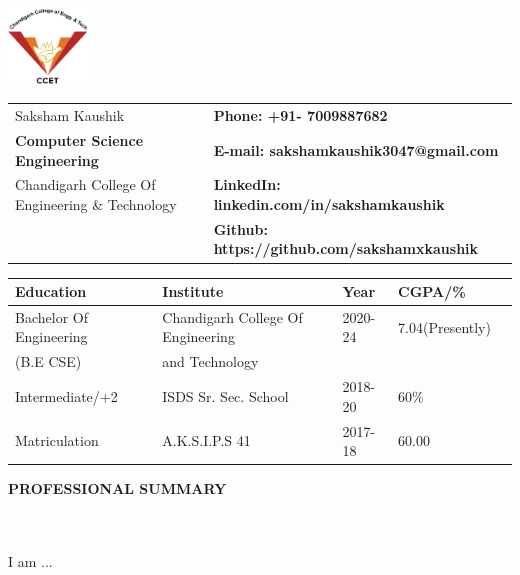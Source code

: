 \documentclass[a4paper,10pt]{article}
\newcommand{\resheading}[1]{{\small \colorbox{mygrey}{\begin{minipage}{0.99\textwidth}{\textbf{#1 \vphantom{p\^{E}}}}\end{minipage}}}}
\begin{document}

\begin{table}
    \begin{minipage}{0.15\linewidth}
        \centering
        \includegraphics[height =0.8in]{ccetLogoBlack (2).png}
    \end{minipage}
    \begin{minipage}{0.45\linewidth}
        \setlength{\tabcolsep}{15pt}
        \def\arraystretch{1.15}
        \begin{tabular}{ll}
            \usepackage{hyperref}{\Large{Saksham Kaushik}}  & \textbf{Phone: +91-  7009887682} \\
            \textbf{Computer Science Engineering} & \textbf{E-mail: sakshamkaushik3047@gmail.com} \\
        Chandigarh College Of Engineering \& Technology  &  \textbf{LinkedIn: linkedin.com/in/sakshamkaushik}  \\
        \textbf{} & \textbf{Github: https://github.com/sakshamxkaushik}
        \end{tabular}
    \end{minipage}
\end{table}    

\setlength{\tabcolsep}{18pt}
\begin{table}
\centering
\begin{tabular}{lllll}
\toprule
\textbf{Education}   & \textbf{Institute}    & \textbf{Year}     & \textbf{CGPA/\%} \\ 
\toprule
Bachelor Of Engineering      & Chandigarh College Of Engineering & 2020-24   & 7.04(Presently)\\ 
(B.E CSE) & and Technology\\
Intermediate/+2     & ISDS Sr. Sec. School & 2018-20& 60\%    \\ 
Matriculation   & A.K.S.I.P.S 41    & 2017-18         & 60.00    \\
\bottomrule 
\end{tabular}
\end{table}
\noindent
\resheading{\textbf{PROFESSIONAL SUMMARY}}\\[-0.4cm]
\vspace{0.3cm}
\\
 I am ...
\\
\noindent
\end{document}
